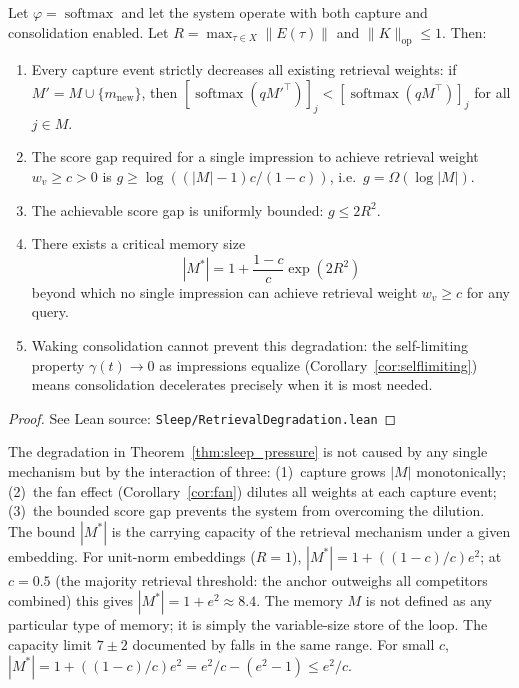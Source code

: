 \begin{theorem}
\label{thm:sleep_pressure}
\leanok
{}
Let $\varphi = \operatorname{softmax}$ and let the system operate with both capture and consolidation enabled.  Let $R = \max_{\tau \in X}\|E(\tau)\|$ and $\|K\|_{\mathrm{op}} \leq 1$.  Then:
\begin{enumerate}
\item Every capture event strictly decreases all existing retrieval weights: if $M' = M \cup \{m_{\mathrm{new}}\}$, then $[\operatorname{softmax}(qM'^\top)]_j < [\operatorname{softmax}(qM^\top)]_j$ for all $j \in M$.
\item The score gap required for a single impression to achieve retrieval weight $w_v \geq c > 0$ is $g \geq \log((|M| - 1)c/(1-c))$, i.e.\ $g = \Omega(\log |M|)$.
\item The achievable score gap is uniformly bounded: $g \leq 2R^2$.
\item There exists a critical memory size
\[
|M^*| = 1 + \frac{1-c}{c}\exp(2R^2)
\]
beyond which no single impression can achieve retrieval weight $w_v \geq c$ for any query.
\item Waking consolidation cannot prevent this degradation: the self-limiting property $\gamma(t) \to 0$ as impressions equalize (Corollary~\ref{cor:selflimiting}) means consolidation decelerates precisely when it is most needed.
\end{enumerate}
\end{theorem}

\begin{proof}
\leanok
{}
See Lean source: \texttt{Sleep/RetrievalDegradation.lean}
\end{proof}

\begin{remark}
\label{rem:sleep_pressure}
\leanok
{}
The degradation in Theorem~\ref{thm:sleep_pressure} is not caused by any single mechanism but by the interaction of three: (1)~capture grows $|M|$ monotonically; (2)~the fan effect (Corollary~\ref{cor:fan}) dilutes all weights at each capture event; (3)~the bounded score gap prevents the system from overcoming the dilution.  The bound $|M^*|$ is the carrying capacity of the retrieval mechanism under a given embedding.  For unit-norm embeddings ($R = 1$), $|M^*| = 1 + ((1-c)/c)e^2$; at $c = 0.5$ (the majority retrieval threshold: the anchor outweighs all competitors combined) this gives $|M^*| = 1 + e^2 \approx 8.4$.  The memory $M$ is not defined as any particular type of memory; it is simply the variable-size store of the loop.  The capacity limit $7 \pm 2$ documented by \citet{miller1956} falls in the same range.  For small $c$, $|M^*| = 1 + ((1-c)/c)e^2 = e^2/c - (e^2 - 1) \leq e^2/c$.
\end{remark}

